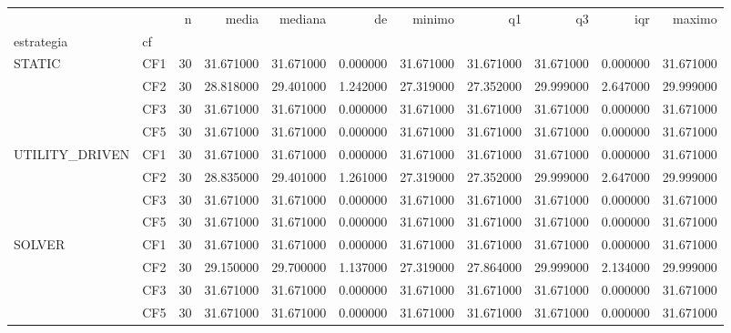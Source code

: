 \begin{tabular}{llrrrrrrrrr}
\toprule
 &  & n & media & mediana & de & minimo & q1 & q3 & iqr & maximo \\
estrategia & cf &  &  &  &  &  &  &  &  &  \\
\midrule
\multirow[t]{4}{*}{STATIC} & CF1 & 30 & 31.671000 & 31.671000 & 0.000000 & 31.671000 & 31.671000 & 31.671000 & 0.000000 & 31.671000 \\
 & CF2 & 30 & 28.818000 & 29.401000 & 1.242000 & 27.319000 & 27.352000 & 29.999000 & 2.647000 & 29.999000 \\
 & CF3 & 30 & 31.671000 & 31.671000 & 0.000000 & 31.671000 & 31.671000 & 31.671000 & 0.000000 & 31.671000 \\
 & CF5 & 30 & 31.671000 & 31.671000 & 0.000000 & 31.671000 & 31.671000 & 31.671000 & 0.000000 & 31.671000 \\
\cline{1-11}
\multirow[t]{4}{*}{UTILITY_DRIVEN} & CF1 & 30 & 31.671000 & 31.671000 & 0.000000 & 31.671000 & 31.671000 & 31.671000 & 0.000000 & 31.671000 \\
 & CF2 & 30 & 28.835000 & 29.401000 & 1.261000 & 27.319000 & 27.352000 & 29.999000 & 2.647000 & 29.999000 \\
 & CF3 & 30 & 31.671000 & 31.671000 & 0.000000 & 31.671000 & 31.671000 & 31.671000 & 0.000000 & 31.671000 \\
 & CF5 & 30 & 31.671000 & 31.671000 & 0.000000 & 31.671000 & 31.671000 & 31.671000 & 0.000000 & 31.671000 \\
\cline{1-11}
\multirow[t]{4}{*}{SOLVER} & CF1 & 30 & 31.671000 & 31.671000 & 0.000000 & 31.671000 & 31.671000 & 31.671000 & 0.000000 & 31.671000 \\
 & CF2 & 30 & 29.150000 & 29.700000 & 1.137000 & 27.319000 & 27.864000 & 29.999000 & 2.134000 & 29.999000 \\
 & CF3 & 30 & 31.671000 & 31.671000 & 0.000000 & 31.671000 & 31.671000 & 31.671000 & 0.000000 & 31.671000 \\
 & CF5 & 30 & 31.671000 & 31.671000 & 0.000000 & 31.671000 & 31.671000 & 31.671000 & 0.000000 & 31.671000 \\
\cline{1-11}
\bottomrule
\end{tabular}
